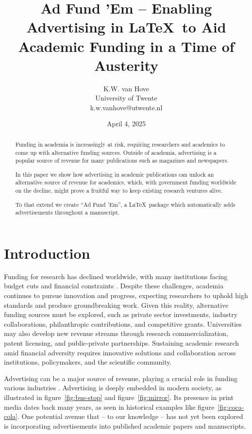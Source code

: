 \documentclass[letterpaper, twocolumn]{article}
\title{Ad Fund 'Em -- Enabling Advertising in \LaTeX \ to Aid Academic Funding in a Time of Austerity}
\author{
	K.W. van Hove \\ University of Twente\\
	k.w.vanhove@utwente.nl
}
\date{April 4, 2025}
\begin{document}
	\maketitle
	
	\begin{abstract}
		Funding in academia is increasingly at risk, requiring researchers and academics to come up with alternative funding sources. Outside of academia, advertising is a popular source of revenue for many publications such as magazines and newspapers.
		
		In this paper we show how advertising in academic publications can unlock an alternative source of revenue for academics, which, with government funding worldwide on the decline, might prove a fruitful way to keep existing research ventures alive.
		
		To that extend we create ``Ad Fund 'Em'', a \LaTeX \ package which automatically adds advertisements throughout a manuscript.
	\end{abstract}
	
	\section{Introduction}
	Funding for research has declined worldwide, with many institutions facing budget cuts and financial constraints \cite{Mallapaty_2025, HogerOnderwijsPersbureau_2024}. Despite these challenges, academia continues to pursue innovation and progress, expecting researchers to uphold high standards and produce groundbreaking work. Given this reality, alternative funding sources must be explored, such as private sector investments, industry collaborations, philanthropic contributions, and competitive grants. Universities may also develop new revenue streams through research commercialization, patent licensing, and public-private partnerships. Sustaining academic research amid financial adversity requires innovative solutions and collaboration across institutions, policymakers, and the scientific community.
	
	Advertising can be a major source of revenue, playing a crucial role in funding various industries \cite{bekh2020advertising}. Advertising is deeply embedded in modern society, as illustrated in figure~\ref{fig:bus-stop} and figure~\ref{fig:mirror}. Its presence in print media dates back many years, as seen in historical examples like figure~\ref{fig:coca-cola}. One potential avenue that -- to our knowledge -- has not yet been explored is incorporating advertisements into published academic papers and manuscripts.
	
\end{document}
